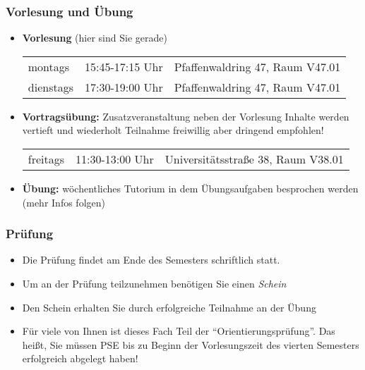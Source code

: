 \documentclass{../../presentation}
\begin{document}
\begin{frame}[fragile]
  \frametitle{Vorlesung und Übung}

  \begin{itemize}
    \item \textbf{Vorlesung} (hier sind Sie gerade)

      \begingroup
      \large
      \medskip
      \begin{tabular}{lll}
      montags & 15:45-17:15 Uhr & Pfaffenwaldring 47, Raum V47.01 \\
      dienstags & 17:30-19:00 Uhr & Pfaffenwaldring 47, Raum V47.01 \\
      \end{tabular}
      \medskip
      \endgroup
    \item \textbf{Vortragsübung:}
      Zusatzveranstaltung neben der Vorlesung \newline
      Inhalte werden vertieft und wiederholt \newline
      Teilnahme freiwillig aber dringend empfohlen!

      \begingroup
      \large
      \medskip
      \begin{tabular}{lll}
      freitags & 11:30-13:00 Uhr & Universitätsstraße 38, Raum V38.01 \\
      \end{tabular}
      \medskip
      \endgroup
    \item \textbf{Übung:} wöchentliches Tutorium in dem Übungsaufgaben besprochen werden (mehr Infos folgen)
  \end{itemize}
\end{frame}

\begin{frame}[fragile]
  \frametitle{Prüfung}

  \begin{itemize}
    \item Die Prüfung findet am Ende des Semesters schriftlich statt.
    \item Um an der Prüfung teilzunehmen benötigen Sie einen \emph{Schein}
    \item Den Schein erhalten Sie durch erfolgreiche Teilnahme an der Übung

    \item Für viele von Ihnen ist dieses Fach Teil der \enquote{Orientierungsprüfung}.
      Das heißt, Sie müssen PSE bis zu Beginn der Vorlesungszeit des vierten Semesters erfolgreich abgelegt haben!
  \end{itemize}
\end{frame}
\end{document}
